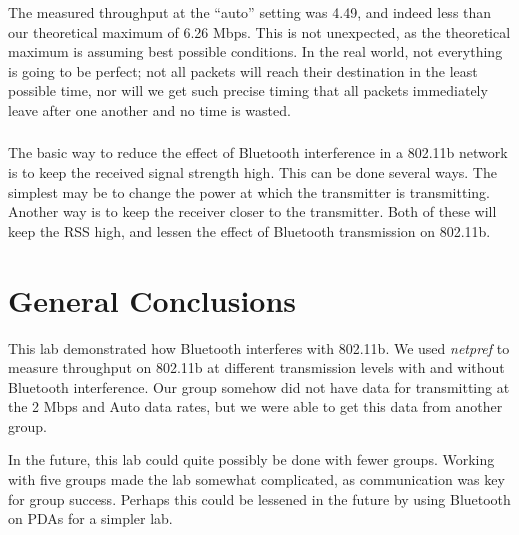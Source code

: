 \documentclass[11pt]{article}
\begin{document}
\subsubsection{}

The measured throughput at the ``auto'' setting was 4.49, and indeed less than our theoretical maximum of 6.26 Mbps. This is not unexpected, as the theoretical maximum is assuming best possible conditions. In the real world, not everything is going to be perfect; not all packets will reach their destination in the least possible time, nor will we get such precise timing that all packets immediately leave after one another and no time is wasted.

\subsubsection{}

The basic way to reduce the effect of Bluetooth interference in a 802.11b network is to keep the received signal strength high. This can be done several ways. The simplest may be to change the power at which the transmitter is transmitting. Another way is to keep the receiver closer to the transmitter. Both of these will keep the RSS high, and lessen the effect of Bluetooth transmission on 802.11b.

\section{General Conclusions}

This lab demonstrated how Bluetooth interferes with 802.11b. We used \emph{netpref} to measure throughput on 802.11b at different transmission levels with and without Bluetooth interference. Our group somehow did not have data for transmitting at the 2 Mbps and Auto data rates, but we were able to get this data from another group.

In the future, this lab could quite possibly be done with fewer groups. Working with five groups made the lab somewhat complicated, as communication was key for group success. Perhaps this could be lessened in the future by using Bluetooth on PDAs for a simpler lab.
\end{document}
